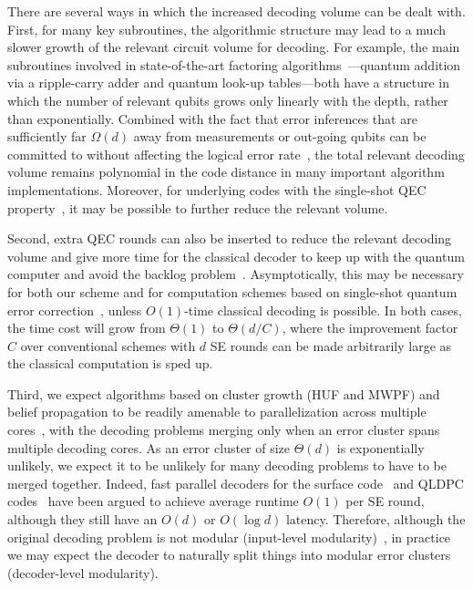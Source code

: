 There are several ways in which the increased decoding volume can be dealt with.
%
First, for many key subroutines, the algorithmic structure may lead to a much slower growth of the relevant circuit volume for decoding.
%
For example, the main subroutines involved in state-of-the-art factoring algorithms~\cite{gidney2019how}---quantum addition via a ripple-carry adder and quantum look-up tables---both have a structure in which the number of relevant qubits grows only linearly with the depth, rather than exponentially.
%
Combined with the fact that error inferences that are sufficiently far $\Omega(d)$ away from measurements or out-going qubits can be committed to without affecting the logical error rate~\cite{bombin2023modular}, the total relevant decoding volume remains polynomial in the code distance in many important algorithm implementations.
%
Moreover, for underlying codes with the single-shot QEC property~\cite{bombin2015single}, it may be possible to further reduce the relevant volume.

Second, extra QEC rounds can also be inserted to reduce the relevant decoding volume and give more time for the classical decoder to keep up with the quantum computer and avoid the backlog problem~\cite{terhal2015quantum}.
%
Asymptotically, this may be necessary for both our scheme and for computation schemes based on single-shot quantum error correction~\cite{bombin2015single,bombin2013gauge}, unless $O(1)$-time classical decoding is possible.
%
In both cases, the time cost will grow from $\Theta(1)$ to $\Theta(d/C)$, where the  improvement factor $C$ over conventional schemes with $d$ SE rounds can be made arbitrarily large as the classical computation is sped up.

Third, we expect algorithms based on cluster growth (HUF and MWPF) and belief propagation to be readily amenable to parallelization across multiple cores~\cite{liyanage2023scalable,richardson2008modern,fowler2015minimum,wu2023fusion}, with the decoding problems merging only when an error cluster spans multiple decoding cores.
%
As an error cluster of size $\Theta(d)$ is exponentially unlikely, we expect it to be unlikely for many decoding problems to have to be merged together.
%
Indeed, fast parallel decoders for the surface code~\cite{fowler2015minimum,wu2023fusion} and QLDPC codes~\cite{grospellier2019} have been argued to achieve average runtime $O(1)$ per SE round, although they still have an $O(d)$ or $O(\log d)$ latency.
%
Therefore, although the original decoding problem is not modular (input-level modularity)~\cite{tan2023scalable,skoric2023parallel,bombin2023modular}, in practice we may expect the decoder to naturally split things into modular error clusters (decoder-level modularity).

